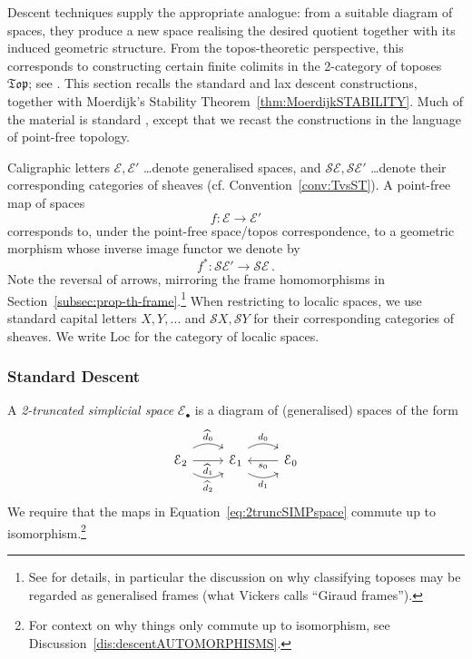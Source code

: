 \documentclass[a4paper, 11pt,reqno]{amsart}
\newcommand{\Loc}{\mathrm{Loc}}
\newcommand{\baseS}{\mathcal{S}}
\newcommand{\E}{\mathcal{E}}
\begin{document}
Descent techniques supply the appropriate analogue: from a suitable diagram of spaces, they produce a new space realising the desired quotient together with its induced geometric structure. From the  topos-theoretic perspective, this corresponds to constructing certain finite colimits in the 2-category of toposes $\mathfrak{Top}$; see \cite[B3.4]{Elephant}. This section recalls the standard and lax descent constructions, together with Moerdijk's Stability Theorem~\ref{thm:MoerdijkSTABILITY}. Much of the material is standard \cite{JoyalTierney,Moerdijk}, except that we recast the constructions in the language of point-free topology.

\begin{convention} Caligraphic letters $\E,\E'$ \dots denote generalised spaces, and $\baseS\E,\baseS\E'$ \dots denote their corresponding categories of sheaves (cf. Convention~\ref{conv:TvsST}). A point-free map of spaces
 $$f\colon \E\to\E'$$ corresponds to, under the point-free space/topos correspondence, to a geometric morphism whose inverse image functor we denote by
	$$f^{\ast}\colon \baseS\E'\longrightarrow\baseS\E\,.$$ 
Note the reversal of arrows, mirroring the frame homomorphisms in Section~\ref{subsec:prop-th-frame}.\footnote{See \cite{VickersPtfreePtwise} for details, in particular the discussion on why classifying toposes may be regarded as generalised frames (what Vickers calls ``Giraud frames'').}	When restricting to localic spaces, we use standard capital letters $X,Y,\ldots$ and $\baseS X,\baseS Y$ for their corresponding categories of sheaves. We write $\Loc$ for the category of localic spaces.
\end{convention}

\subsubsection{Standard Descent} A \textit{2-truncated simplicial space} $\E_{\bullet}$ is a diagram of (generalised) spaces of the form
\begin{equation}\label{eq:2truncSIMPspace}
\begin{tikzcd}\mathcal{E}_2 \ar[r, bend right, shift right=1ex, swap, "\widehat{d}_2"] \ar[r,swap,"\widehat{d}_1"] \ar[r,bend left, shift left=1ex,  "\widehat{d}_0"]& \mathcal{E}_1 \ar[r, bend right,shift right=1ex, swap, "d_1"] \ar[r, bend left, shift left=1ex, "d_0"] & \mathcal{E}_0 \ar[l, "s_0"] \end{tikzcd}
\end{equation} 
We require that the maps in Equation~\eqref{eq:2truncSIMPspace} commute up to isomorphism.\footnote{For context on why things only commute up to isomorphism, see Discussion~\ref{dis:descentAUTOMORPHISMS}.}
\end{document}
